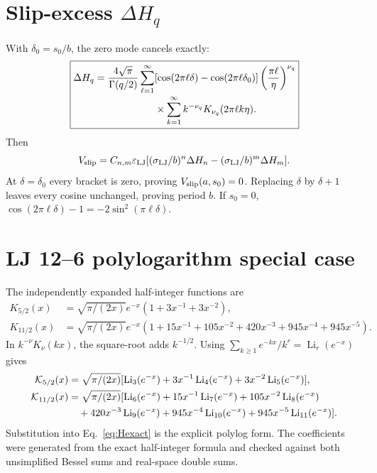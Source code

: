 \documentclass[11pt,letterpaper]{article}
\newcommand{\epsLJ}{\varepsilon_{\mathrm{LJ}}}
\newcommand{\sigLJ}{\sigma_{\mathrm{LJ}}}
\begin{document}
\section{Slip-excess $\Delta H_q$}

With $\delta_0=s_0/b$, the zero mode cancels exactly:
\begin{equation}
\boxed{\begin{aligned}
 \Delta H_q={4\sqrt\pi\over\Gamma(q/2)}
 \sum_{\ell=1}^{\infty}&[\cos(2\pi\ell\delta)-
 \cos(2\pi\ell\delta_0)]
 \left({\pi\ell\over\eta}\right)^{\nu_q}\\[-0.2em]
 &\times\sum_{k=1}^{\infty}k^{-\nu_q}
 K_{\nu_q}(2\pi\ell k\eta).
\end{aligned}}
\label{eq:DeltaH}
\end{equation}
Then
\begin{equation}
 V_{\rm slip}=C_{n,m}\epsLJ[(\sigLJ/b)^n\Delta H_n-
 (\sigLJ/b)^m\Delta H_m].
 \label{eq:Vslip}
\end{equation}
At $\delta=\delta_0$ every bracket is zero, proving
$V_{\rm slip}(a,s_0)=0$.  Replacing $\delta$ by $\delta+1$ leaves every cosine
unchanged, proving period $b$.  If $s_0=0$,
$\cos(2\pi\ell\delta)-1=-2\sin^2(\pi\ell\delta)$.

\section{LJ 12--6 polylogarithm special case}
\label{sec:polylog}

The independently expanded half-integer functions are
\begin{align}
 K_{5/2}(x)&=\sqrt{\pi/(2x)}e^{-x}(1+3x^{-1}+3x^{-2}),\\
 K_{11/2}(x)&=\sqrt{\pi/(2x)}e^{-x}(1+15x^{-1}+105x^{-2}
 +420x^{-3}+945x^{-4}+945x^{-5}).
\end{align}
In $k^{-\nu}K_\nu(kx)$, the square-root adds $k^{-1/2}$.
Using $\sum_{k\ge1}e^{-kx}/k^r=\operatorname{Li}_r(e^{-x})$ gives
\begin{align}
\mathcal K_{5/2}(x)&=\sqrt{\pi/(2x)}[\operatorname{Li}_3(e^{-x})
 +3x^{-1}\operatorname{Li}_4(e^{-x})+3x^{-2}\operatorname{Li}_5(e^{-x})],
 \label{eq:poly6}\\
\mathcal K_{11/2}(x)&=\sqrt{\pi/(2x)}[\operatorname{Li}_6(e^{-x})
 +15x^{-1}\operatorname{Li}_7(e^{-x})+105x^{-2}\operatorname{Li}_8(e^{-x})\notag\\
&\quad+420x^{-3}\operatorname{Li}_9(e^{-x})
 +945x^{-4}\operatorname{Li}_{10}(e^{-x})
 +945x^{-5}\operatorname{Li}_{11}(e^{-x})].
 \label{eq:poly12}
\end{align}
Substitution into Eq.~\eqref{eq:Hexact} is the explicit polylog form.  The
coefficients were generated from the exact half-integer formula and checked
against both unsimplified Bessel sums and real-space double sums.
\end{document}

